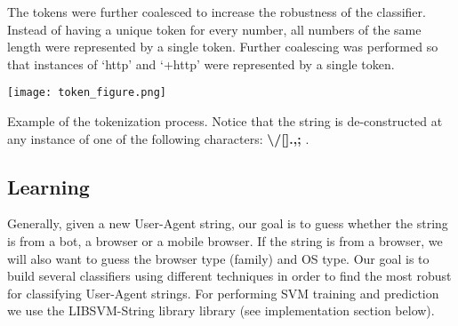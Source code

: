 \documentclass[10pt]{article}
\makeatletter
\newenvironment{figurehere}
  {\def\@captype{figure}}
  {}
\makeatother
\begin{document}
\begin{multicols}{2}
The tokens were further coalesced to increase the robustness of the classifier.  Instead of having a unique token for every number, all numbers of the same length were represented by a single token.  Further coalescing was performed so that instances of `http' and `+http' were represented by a single token.      

\begin{center}
\begin{figurehere}
\texttt{[image: token\_figure.png]}
\caption{Example of the tokenization process.  Notice that the string is de-constructed at any instance of one of the following characters: {\bf \textbackslash /[].,;}  .}
\end{figurehere}
\end{center}

\subsection{Learning}
Generally, given a new User-Agent string, our goal is to guess whether the string is from a bot, a browser or a mobile browser.  If the string is from a browser, we will also want to guess the browser type (family) and OS type.    Our goal is to build several classifiers using different techniques in order to find the most robust for classifying User-Agent strings.  For performing SVM training and prediction we use the LIBSVM-String library library (see implementation section below).\cite{libsvm}\cite{libsvm-string}  


\end{multicols}
\end{document}
